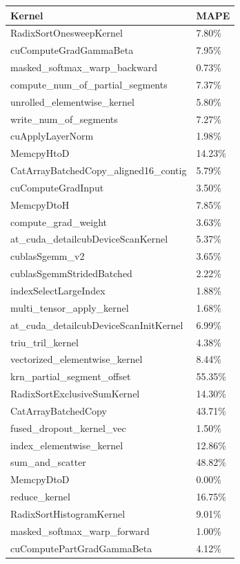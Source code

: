 \begin{table}[htbp]
\centering
\begin{tabular}{l l}
\toprule
\textbf{Kernel} & \textbf{MAPE}\\
\midrule
RadixSortOnesweepKernel & 7.80\% \\
cuComputeGradGammaBeta & 7.95\% \\
masked\_softmax\_warp\_backward & 0.73\% \\
compute\_num\_of\_partial\_segments & 7.37\% \\
unrolled\_elementwise\_kernel & 5.80\% \\
write\_num\_of\_segments & 7.27\% \\
cuApplyLayerNorm & 1.98\% \\
MemcpyHtoD & 14.23\% \\
CatArrayBatchedCopy\_aligned16\_contig & 5.79\% \\
cuComputeGradInput & 3.50\% \\
MemcpyDtoH & 7.85\% \\
compute\_grad\_weight & 3.63\% \\
at\_cuda\_detailcubDeviceScanKernel & 5.37\% \\
cublasSgemm\_v2 & 3.65\% \\
cublasSgemmStridedBatched & 2.22\% \\
indexSelectLargeIndex & 1.88\% \\
multi\_tensor\_apply\_kernel & 1.68\% \\
at\_cuda\_detailcubDeviceScanInitKernel & 6.99\% \\
triu\_tril\_kernel & 4.38\% \\
vectorized\_elementwise\_kernel & 8.44\% \\
krn\_partial\_segment\_offset & 55.35\% \\
RadixSortExclusiveSumKernel & 14.30\% \\
CatArrayBatchedCopy & 43.71\% \\
fused\_dropout\_kernel\_vec & 1.50\% \\
index\_elementwise\_kernel & 12.86\% \\
sum\_and\_scatter & 48.82\% \\
MemcpyDtoD & 0.00\% \\
reduce\_kernel & 16.75\% \\
RadixSortHistogramKernel & 9.01\% \\
masked\_softmax\_warp\_forward & 1.00\% \\
cuComputePartGradGammaBeta & 4.12\% \\

\end{tabular}
\end{table}
